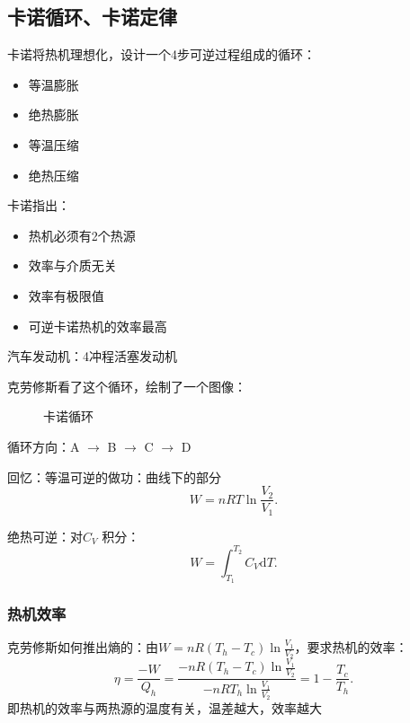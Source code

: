 \subsection{卡诺循环、卡诺定律}%
\label{sub:卡诺循环，卡诺定律}
卡诺将热机理想化，设计一个4步可逆过程组成的循环：
\begin{itemize}
    \item 等温膨胀
    \item 绝热膨胀
    \item 等温压缩
    \item 绝热压缩
\end{itemize}
卡诺指出：
\begin{itemize}
    \item 热机必须有2个热源
    \item 效率与介质无关
    \item 效率有极限值
    \item 可逆卡诺热机的效率最高
\end{itemize}
\begin{eg}
    汽车发动机：4冲程活塞发动机
\end{eg}
克劳修斯看了这个循环，绘制了一个图像：
\begin{figure}[ht!]
    \centering
    \caption{卡诺循环}
    \label{fig:卡诺循环}
\end{figure}

循环方向：A $\to $ B $\to $ C $\to $ D

回忆：等温可逆的做功：曲线下的部分\[
    W = nRT \ln \frac{V_2}{V_1}
.\]

绝热可逆：对$C_{V}$ 积分：\[
    W = \int_{T_1}^{T_2} C_{V} \mathrm{d}T
.\]
\subsubsection*{热机效率}%
\label{subsub*:热机效率}
    克劳修斯如何推出熵的：由$W = nR\left( T_{h}-T_c \right)\ln \frac{V_1}{V_2}$，要求热机的效率：
    \[
        \eta = \frac{-W}{Q_{h}} = \frac{-nR\left( T_{h}-T_c \right)\ln \frac{V_1}{V_2}}{-nRT_{h}\ln \frac{V_1}{V_2}} = 1-\frac{T_{c}}{T_h}
    .\]
即热机的效率与两热源的温度有关，温差越大，效率越大
